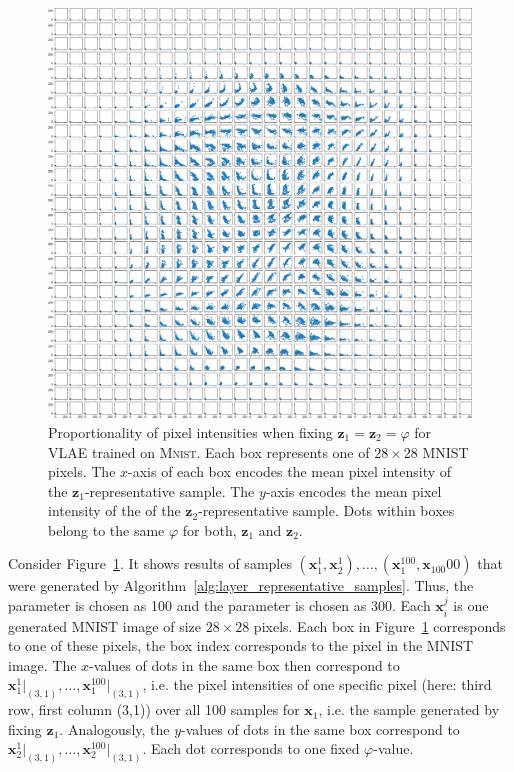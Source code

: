\begin{figure}
    \centering
    \includegraphics[width=\textwidth]{images/notprop/mnist/vlae/ccs_0_1_vlae.png}
    \caption[\ac{VLAE} on \textsc{Mnist} - Pixel proportionality]{Proportionality of pixel intensities when fixing $\bm{z}_1 = \bm{z}_2=\varphi$ for \ac{VLAE} trained on \textsc{Mnist}. Each box represents one of $28\times 28$ MNIST pixels. The $x$-axis of each box encodes the mean pixel intensity of the $\bm{z}_1$-representative sample. The $y$-axis encodes the mean pixel intensity of the of the $\bm{z}_2$-representative sample. Dots within boxes belong to the same $\varphi$ for both, $\bm{z}_1$ and $\bm{z}_2$. }
    \label{fig:notprop}
\end{figure}

Consider Figure~\ref{fig:notprop}.
It shows results of samples $(\bm{x}_1^1,\bm{x}_2^1),\dots,(\bm{x}_1^{100},\bm{x}_{100}00)$ that were generated by Algorithm~\ref{alg:layer_representative_samples}.
Thus, the parameter  is chosen as 100 and the parameter  is chosen as 300.
Each $\bm{x}_i^j$ is one generated MNIST image of size $28\times 28$ pixels.
Each box in Figure~\ref{fig:notprop} corresponds to one of these pixels, the box index corresponds to the pixel in the MNIST image.
The $x$-values of dots in the same box then correspond to $\bm{x}_1^1\big|_{(3,1)}, \dots, \bm{x}_1^{100}\big|_{(3,1)}$, i.e. the pixel intensities of one specific pixel (here: third row, first column (3,1)) over all 100 samples for $\bm{x}_1$, i.e. the sample generated by fixing $\bm{z}_1$.
Analogously, the $y$-values of dots in the same box correspond to $\bm{x}_2^1\big|_{(3,1)}, \dots, \bm{x}_2^{100}\big|_{(3,1)}$.
Each dot corresponds to one fixed $\varphi$-value.

